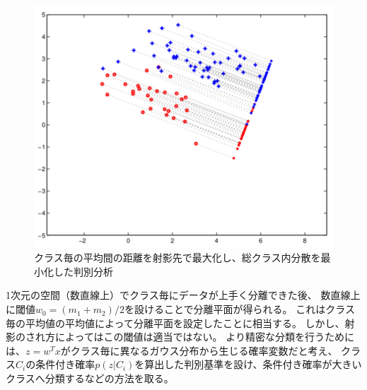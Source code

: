 \begin{figure}
    \centering
    \includegraphics[width=12cm]{images/var_dis.png}
    \caption{クラス毎の平均間の距離を射影先で最大化し、総クラス内分散を最小化した判別分析}
    \label{fig:var_dis}
\end{figure}

1次元の空間（数直線上）でクラス毎にデータが上手く分離できた後、
数直線上に閾値\(w_0=(m_1+m_2)/2\)を設けることで分離平面が得られる。
これはクラス毎の平均値の平均値によって分離平面を設定したことに相当する。
しかし、射影のされ方によってはこの閾値は適当ではない。
より精密な分類を行うためには、\(z=w^Tx\)がクラス毎に異なるガウス分布から生じる確率変数だと考え、
クラス\(C_i\)の条件付き確率\(p(z|C_i)\)を算出した判別基準を設け、条件付き確率が大きいクラスへ分類するなどの方法を取る。

